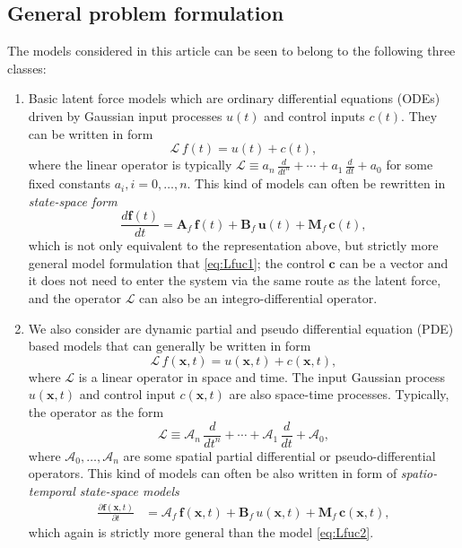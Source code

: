 \documentclass[journal]{IEEEtran}
\begin{document}
\subsection{General problem formulation}
%
The models considered in this article can be seen to belong to the following three classes:
%
\begin{enumerate}
\item Basic latent force models which are ordinary differential equations (ODEs) driven by Gaussian input processes $u(t)$ and control inputs $c(t)$. They can be written in form
%
\begin{equation}
  \mathcal{L} \, f(t) = u(t) + c(t),
\label{eq:Lfuc1}
\end{equation}
%
where the linear operator is typically $\mathcal{L}\equiv a_n \, \frac{d}{dt^{n}} + \cdots + a_1 \, \frac{d}{dt} + a_0$ for some fixed constants $a_i, i=0,\ldots,n$. This kind of models can often be rewritten in 
\emph{state-space form}
%
\begin{equation}
  \frac{d\mathbf{f}(t)}{dt} = \mathbf{A}_f \, \mathbf{f}(t) + \mathbf{B}_f \, \mathbf{u}(t) + \mathbf{M}_f \, \mathbf{c}(t),
\end{equation}
%
which is not only equivalent to the representation above, but strictly more general model formulation that \eqref{eq:Lfuc1}; the control $\mathbf{c}$ can be a vector and it does not need to enter the system via the same route as the latent force, and the operator $\mathcal{L}$ can also be an integro-differential operator.

\item We also consider are dynamic partial and pseudo differential equation (PDE) based models that can generally be written in form
%
\begin{equation}
  \mathcal{L} \, f(\mathbf{x},t) = u(\mathbf{x},t) + c(\mathbf{x},t),
\label{eq:Lfuc2}
\end{equation}
%
where $\mathcal{L}$ is a linear operator in space and time. The input Gaussian process $u(\mathbf{x},t)$ and control input $c(\mathbf{x},t)$ are also space-time processes. Typically, the operator as the form
%
\begin{equation}
  \mathcal{L}\equiv \mathcal{A}_n \, \frac{d}{dt^{n}} + \cdots + \mathcal{A}_1 \, \frac{d}{dt} + \mathcal{A}_0,
\label{eq:Lfuc2}
\end{equation}
%
where $\mathcal{A}_0,\ldots,\mathcal{A}_n$ are some spatial partial differential or pseudo-differential operators. This kind of models can often be also written in form of \emph{spatio-temporal state-space models}
%
\begin{equation}
\begin{split}
  \frac{\partial \mathbf{f}(\mathbf{x},t)}{\partial t}
  &= \mathbf{\mathcal{A}}_f \, \mathbf{f}(\mathbf{x},t) + \mathbf{B}_f \, u(\mathbf{x},t) + \mathbf{M}_f \, \mathbf{c}(\mathbf{x},t),
\end{split}
\end{equation}
%
which again is strictly more general than the model \eqref{eq:Lfuc2}. 


\end{enumerate}
\end{document}
